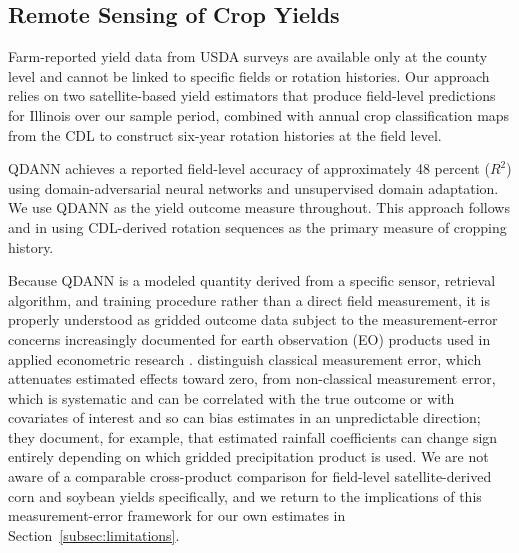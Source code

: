 \documentclass[12pt,letterpaper]{article}
\theoremstyle{remark}
\theoremstyle{remark}
\theoremstyle{plain}
\theoremstyle{definition}
\begin{document}
\subsection{\label{subsec:remote_sensing}Remote Sensing of Crop Yields}

Farm-reported yield data from USDA surveys are available only at the county level and cannot be linked to specific fields or rotation histories. Our approach relies on two satellite-based yield estimators that produce field-level predictions for Illinois over our sample period, combined with annual crop classification maps from the CDL to construct six-year rotation histories at the field level.

QDANN \citep{Ma2024} achieves a reported field-level accuracy of approximately 48 percent ($R^2$) using domain-adversarial neural networks and unsupervised domain adaptation. We use QDANN as the yield outcome measure throughout. This approach follows \citet{Pates2025} and \citet{socolar2021} in using CDL-derived rotation sequences as the primary measure of cropping history.

Because QDANN is a modeled quantity derived from a specific sensor, retrieval algorithm, and training procedure rather than a direct field measurement, it is properly understood as gridded outcome data subject to the measurement-error concerns increasingly documented for earth observation (EO) products used in applied econometric research \citep{Benami2026}. \citet{Benami2026} distinguish classical measurement error, which attenuates estimated effects toward zero, from non-classical measurement error, which is systematic and can be correlated with the true outcome or with covariates of interest and so can bias estimates in an unpredictable direction; they document, for example, that estimated rainfall coefficients can change sign entirely depending on which gridded precipitation product is used. We are not aware of a comparable cross-product comparison for field-level satellite-derived corn and soybean yields specifically, and we return to the implications of this measurement-error framework for our own estimates in Section~\ref{subsec:limitations}.
    
\end{document}

